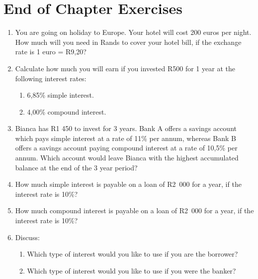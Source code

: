             \section{ End of Chapter Exercises}
            \nopagebreak
            \label{m39335*id75641}\begin{enumerate}[noitemsep, label=\textbf{\arabic*}. ] 
            \label{m39335*uid79}\item You are going on holiday to Europe. Your hotel will cost 200 euros per night. How much will you need in Rands to cover your hotel bill, if the exchange rate is 1 euro = R9,20?\newline
    
        
\label{m39335*uid80}\item Calculate how much you will earn if you invested R500 for 1 year at the following interest rates:
\label{m39335*id75671}\begin{enumerate}[noitemsep, label=\textbf{\alph*}. ] 
            \label{m39335*uid81}\item 6,85\% simple interest.
\label{m39335*uid82}\item 4,00\% compound interest.
\end{enumerate}
                
\label{m39335*uid83}\item Bianca has R1 450 to invest for 3 years. Bank A offers a savings account which pays simple interest at a rate of 11\% per annum, whereas Bank B offers a savings account paying compound interest at a rate of 10,5\% per annum. Which account would leave Bianca with the highest accumulated balance at the end of the 3 year period?\newline
    
        
\label{m39335*uid84}\item How much simple interest is payable on a loan of R2~000 for a year, if the interest rate is 10\%?\newline
    
        
\label{m39335*uid85}\item How much compound interest is payable on a loan of R2~000 for a year, if the interest rate is 10\%?\newline
    
        
\label{m39335*uid86}\item Discuss:
\label{m39335*id75754}\begin{enumerate}[noitemsep, label=\textbf{\alph*}. ] 
            \label{m39335*uid87}\item Which type of interest would you like to use if you are the borrower?
\label{m39335*uid88}\item Which type of interest would you like to use if you were the banker?
\end{enumerate}
                

\end{enumerate}

